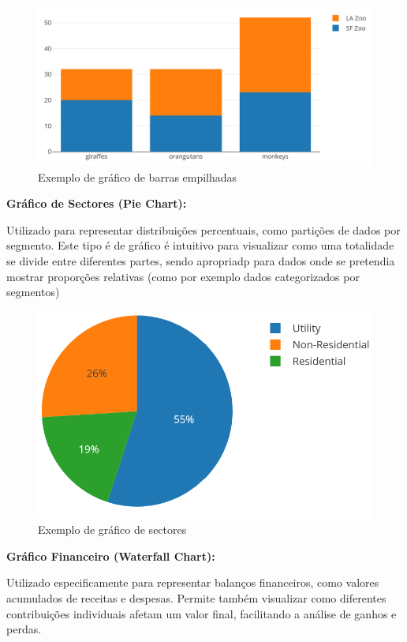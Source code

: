\begin{figure}[H]
\centering
\includegraphics[max width=12cm, keepaspectratio]{./img/empilhada}
\caption{Exemplo de gráfico de barras empilhadas}
\end{figure}
\noindent

\textbf{Gráfico de Sectores (Pie Chart):}  

Utilizado para representar distribuições percentuais, como partições de dados por segmento. Este tipo é de gráfico é intuitivo para visualizar como uma totalidade se divide entre diferentes partes, sendo apropriadp para dados onde se pretendia mostrar proporções relativas (como por exemplo dados categorizados por segmentos)

\begin{figure}[H]
    \centering
    \includegraphics[max width=12cm, keepaspectratio]{./img/pie}
    \caption{Exemplo de gráfico de sectores}
\end{figure}
\noindent

\textbf{Gráfico Financeiro (Waterfall Chart):}  

Utilizado especificamente para representar balanços financeiros, como valores acumulados de receitas e despesas. Permite também visualizar como diferentes contribuições individuais afetam um valor final, facilitando a análise de ganhos e perdas.

